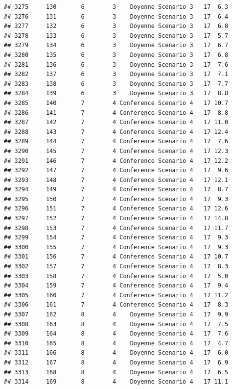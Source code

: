 \documentclass[
]{article}
\begin{document}
\begin{verbatim}
## 3275     130       6        3    Doyenne Scenario 3   17  6.3
## 3276     131       6        3    Doyenne Scenario 3   17  6.4
## 3277     132       6        3    Doyenne Scenario 3   17  6.8
## 3278     133       6        3    Doyenne Scenario 3   17  5.7
## 3279     134       6        3    Doyenne Scenario 3   17  6.7
## 3280     135       6        3    Doyenne Scenario 3   17  6.8
## 3281     136       6        3    Doyenne Scenario 3   17  7.6
## 3282     137       6        3    Doyenne Scenario 3   17  7.1
## 3283     138       6        3    Doyenne Scenario 3   17  7.7
## 3284     139       6        3    Doyenne Scenario 3   17  8.8
## 3285     140       7        4 Conference Scenario 4   17 10.7
## 3286     141       7        4 Conference Scenario 4   17  8.8
## 3287     142       7        4 Conference Scenario 4   17 11.0
## 3288     143       7        4 Conference Scenario 4   17 12.4
## 3289     144       7        4 Conference Scenario 4   17  7.6
## 3290     145       7        4 Conference Scenario 4   17 12.3
## 3291     146       7        4 Conference Scenario 4   17 12.2
## 3292     147       7        4 Conference Scenario 4   17  9.6
## 3293     148       7        4 Conference Scenario 4   17 12.1
## 3294     149       7        4 Conference Scenario 4   17  8.7
## 3295     150       7        4 Conference Scenario 4   17  9.3
## 3296     151       7        4 Conference Scenario 4   17 12.6
## 3297     152       7        4 Conference Scenario 4   17 14.8
## 3298     153       7        4 Conference Scenario 4   17 11.7
## 3299     154       7        4 Conference Scenario 4   17  9.3
## 3300     155       7        4 Conference Scenario 4   17  9.3
## 3301     156       7        4 Conference Scenario 4   17 10.7
## 3302     157       7        4 Conference Scenario 4   17  8.3
## 3303     158       7        4 Conference Scenario 4   17  5.0
## 3304     159       7        4 Conference Scenario 4   17  9.4
## 3305     160       7        4 Conference Scenario 4   17 11.2
## 3306     161       7        4 Conference Scenario 4   17  8.3
## 3307     162       8        4    Doyenne Scenario 4   17  9.9
## 3308     163       8        4    Doyenne Scenario 4   17  7.5
## 3309     164       8        4    Doyenne Scenario 4   17  7.6
## 3310     165       8        4    Doyenne Scenario 4   17  4.7
## 3311     166       8        4    Doyenne Scenario 4   17  6.0
## 3312     167       8        4    Doyenne Scenario 4   17  6.9
## 3313     168       8        4    Doyenne Scenario 4   17  6.5
## 3314     169       8        4    Doyenne Scenario 4   17 11.1

\end{verbatim}
\end{document}
